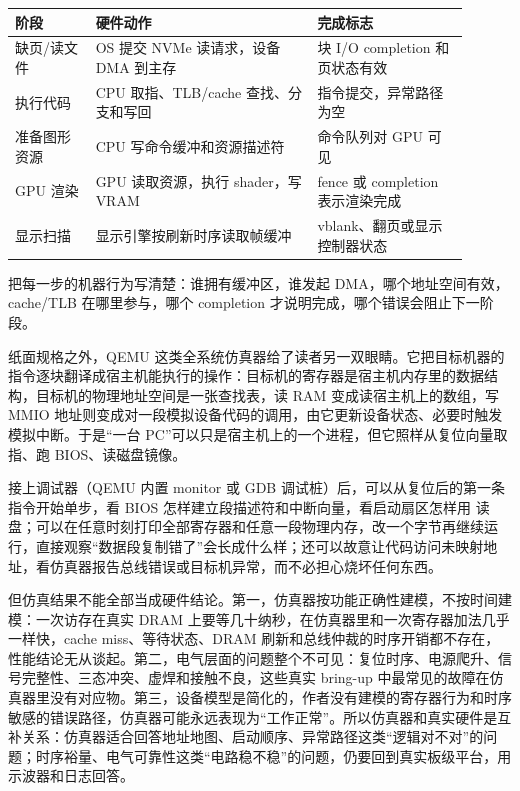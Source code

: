 \begin{longtable}{L{0.16\linewidth}L{0.44\linewidth}L{0.3\linewidth}}
\toprule
阶段 & 硬件动作 & 完成标志 \\
\midrule
缺页/读文件 & OS 提交 NVMe 读请求，设备 DMA 到主存 & 块 I/O completion 和页状态有效 \\
执行代码 & CPU 取指、TLB/cache 查找、分支和写回 & 指令提交，异常路径为空 \\
准备图形资源 & CPU 写命令缓冲和资源描述符 & 命令队列对 GPU 可见 \\
GPU 渲染 & GPU 读取资源，执行 shader，写 VRAM & fence 或 completion 表示渲染完成 \\
显示扫描 & 显示引擎按刷新时序读取帧缓冲 & vblank、翻页或显示控制器状态 \\
\bottomrule
\end{longtable}

把每一步的机器行为写清楚：谁拥有缓冲区，谁发起 DMA，哪个地址空间有效，cache/TLB 在哪里参与，哪个 completion 才说明完成，哪个错误会阻止下一阶段。

纸面规格之外，QEMU 这类全系统仿真器给了读者另一双眼睛。它把目标机器的指令逐块翻译成宿主机能执行的操作：目标机的寄存器是宿主机内存里的数据结构，目标机的物理地址空间是一张查找表，读 RAM 变成读宿主机上的数组，写 MMIO 地址则变成对一段模拟设备代码的调用，由它更新设备状态、必要时触发模拟中断。于是“一台 PC”可以只是宿主机上的一个进程，但它照样从复位向量取指、跑 BIOS、读磁盘镜像。

接上调试器（QEMU 内置 monitor 或 GDB 调试桩）后，可以从复位后的第一条指令开始单步，看 BIOS 怎样建立段描述符和中断向量，看启动扇区怎样用  读盘；可以在任意时刻打印全部寄存器和任意一段物理内存，改一个字节再继续运行，直接观察“数据段复制错了”会长成什么样；还可以故意让代码访问未映射地址，看仿真器报告总线错误或目标机异常，而不必担心烧坏任何东西。

但仿真结果不能全部当成硬件结论。第一，仿真器按功能正确性建模，不按时间建模：一次访存在真实 DRAM 上要等几十纳秒，在仿真器里和一次寄存器加法几乎一样快，cache miss、等待状态、DRAM 刷新和总线仲裁的时序开销都不存在，性能结论无从谈起。第二，电气层面的问题整个不可见：复位时序、电源爬升、信号完整性、三态冲突、虚焊和接触不良，这些真实 bring-up 中最常见的故障在仿真器里没有对应物。第三，设备模型是简化的，作者没有建模的寄存器行为和时序敏感的错误路径，仿真器可能永远表现为“工作正常”。所以仿真器和真实硬件是互补关系：仿真器适合回答地址地图、启动顺序、异常路径这类“逻辑对不对”的问题；时序裕量、电气可靠性这类“电路稳不稳”的问题，仍要回到真实板级平台，用示波器和日志回答。

